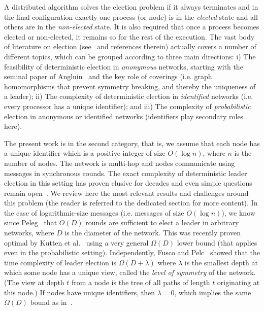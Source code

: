 \documentclass[11pt,envcountsame,letterpaper]{llncs}
\begin{document}
A distributed algorithm solves the
election problem if it always terminates and in the final
configuration exactly one process (or node) is in the \emph{elected} state 
and all
others are in the \emph{non-elected} state. It is also required that 
once a process becomes elected or non-elected, it remains so for the rest of the execution.
The vast body of literature on election (see~\cite{Attiya,Lynch,Santoro,Tel} and references therein) actually covers a number of different topics, which can be grouped according to three main directions: i) The feasibility of deterministic election in {\em anonymous} networks, starting with the seminal paper of Angluin~\cite{Angluin} and the key role of coverings (i.e. graph homomorphisms that prevent symmetry breaking, and thereby the uniqueness of a leader); ii) The complexity of deterministic election in {\em identified} networks (i.e. every processor has a unique identifier); and iii) The complexity of {\em probabilistic} election in anonymous or identified networks (identifiers play secondary roles here).



The present work is in the second category, that is, we assume that each node has a unique identifier which is a positive integer of size $O(\log n)$, where $n$ is the number of nodes. The network is multi-hop and nodes communicate using messages in synchronous rounds.
The exact complexity of deterministic leader election in this setting has proven elusive for decades and even simple questions remain open~\cite{KPPRT15}. We review here the most relevant results and challenges around this problem (the reader is referred to the dedicated section for more content).
In the case of logarithmic-size messages (i.e. messages of size $O(\log n)$), we know since Peleg~\cite{Peleg90} that $O(D)$ rounds are sufficient to elect a leader in arbitrary networks, where $D$ is the diameter of the network.
This was recently proven optimal by Kutten et al.~\cite{KPPRT15}
using a very general $\Omega(D)$ lower bound (that applies even in the probabilistic setting). Independently, Fusco and Pelc~\cite{FP15} showed that the 
time complexity
of leader election is
$\Omega(D+\lambda)$ where $\lambda$ is the smallest depth at which some node has a unique view, called the {\em level of symmetry} of the network. (The view at depth $t$ from a node is the tree of all paths
of length $t$ originating at this node.) If nodes have unique identifiers, then $\lambda=0$, which implies the same $\Omega(D)$ bound as in~\cite{KPPRT15}.
\end{document}
